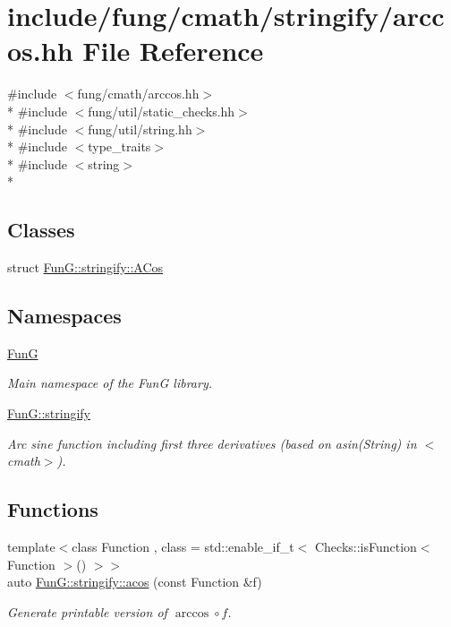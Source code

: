 \hypertarget{stringify_2arccos_8hh}{\section{include/fung/cmath/stringify/arccos.hh File Reference}
\label{stringify_2arccos_8hh}
}
{\ttfamily \#include $<$fung/cmath/arccos.\-hh$>$}\\*
{\ttfamily \#include $<$fung/util/static\-\_\-checks.\-hh$>$}\\*
{\ttfamily \#include $<$fung/util/string.\-hh$>$}\\*
{\ttfamily \#include $<$type\-\_\-traits$>$}\\*
{\ttfamily \#include $<$string$>$}\\*
\subsection*{Classes}
\begin{DoxyCompactItemize}
\item 
struct \hyperlink{structFunG_1_1stringify_1_1ACos}{Fun\-G\-::stringify\-::\-A\-Cos}
\end{DoxyCompactItemize}
\subsection*{Namespaces}
\begin{DoxyCompactItemize}
\item 
\hyperlink{namespaceFunG}{Fun\-G}
\begin{DoxyCompactList}\small\item\em Main namespace of the Fun\-G library. \end{DoxyCompactList}\item 
\hyperlink{namespaceFunG_1_1stringify}{Fun\-G\-::stringify}
\begin{DoxyCompactList}\small\item\em Arc sine function including first three derivatives (based on asin(\-String) in $<$cmath$>$). \end{DoxyCompactList}\end{DoxyCompactItemize}
\subsection*{Functions}
\begin{DoxyCompactItemize}
\item 
{\footnotesize template$<$class Function , class  = std\-::enable\-\_\-if\-\_\-t$<$ Checks\-::is\-Function$<$ Function $>$() $>$$>$ }\\auto \hyperlink{group__StringifyCMathGroup_gaec458ee50fd7b49de4dc2ed1286e8286}{Fun\-G\-::stringify\-::acos} (const Function \&f)
\begin{DoxyCompactList}\small\item\em Generate printable version of $ \arccos\circ f $. \end{DoxyCompactList}\end{DoxyCompactItemize}
